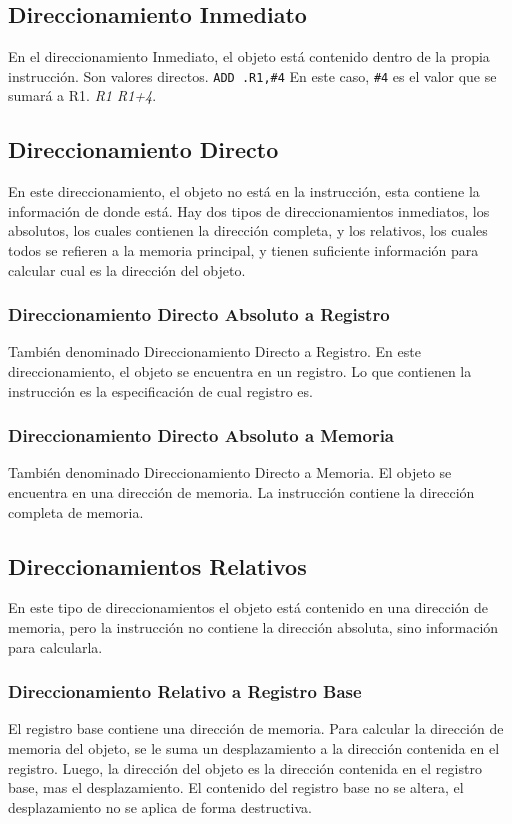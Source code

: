 \documentclass[a4paper,11pt,spanish]{report}
\begin{document}
\subsection{Direccionamiento Inmediato}
En el direccionamiento Inmediato, el objeto está contenido dentro de la propia instrucción. Son valores directos. \verb|ADD .R1,#4| En este caso, \verb|#4| es el valor que se sumará a R1.  \emph{R1 \textleftarrow R1+4}.
\subsection{Direccionamiento Directo}
En este direccionamiento, el objeto no está en la instrucción, esta contiene la información de donde está. Hay dos tipos de direccionamientos inmediatos, los absolutos, los cuales contienen la dirección completa, y los relativos, los cuales todos se refieren a la memoria principal, y tienen suficiente información para calcular cual es la dirección del objeto.
\subsubsection{Direccionamiento Directo Absoluto a Registro}
También denominado Direccionamiento Directo a Registro. En este direccionamiento, el objeto se encuentra en un registro. Lo que contienen la instrucción es la especificación de cual registro es.
\subsubsection{Direccionamiento Directo Absoluto a Memoria}
También denominado Direccionamiento Directo a Memoria. El objeto se encuentra en una dirección de memoria. La instrucción contiene la dirección completa de memoria.
\subsection{Direccionamientos Relativos}
En este tipo de direccionamientos el objeto está contenido en una dirección de memoria, pero la instrucción no contiene la dirección absoluta, sino información para calcularla.
\subsubsection{Direccionamiento Relativo a Registro Base}
El registro base contiene una dirección de memoria. Para calcular la dirección de memoria del objeto, se le suma un desplazamiento a la dirección contenida en el registro. Luego, la dirección del objeto es la dirección contenida en el registro base, mas el desplazamiento. El contenido del registro base no se altera, el desplazamiento no se aplica de forma destructiva.
\end{document}
